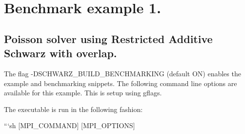 \section*{Benchmark example 1. }

\subsection*{Poisson solver using Restricted Additive Schwarz with overlap. }

The flag {\ttfamily -\/\+D\+S\+C\+H\+W\+A\+R\+Z\+\_\+\+B\+U\+I\+L\+D\+\_\+\+B\+E\+N\+C\+H\+M\+A\+R\+K\+I\+NG} (default {\ttfamily ON}) enables the example and benchmarking snippets. The following command line options are available for this example. This is setup using {\ttfamily gflags}.

The executable is run in the following fashion\+:

```sh \mbox{[}M\+P\+I\+\_\+\+C\+O\+M\+M\+A\+ND\mbox{]} \mbox{[}M\+P\+I\+\_\+\+O\+P\+T\+I\+O\+NS\mbox{]} 
